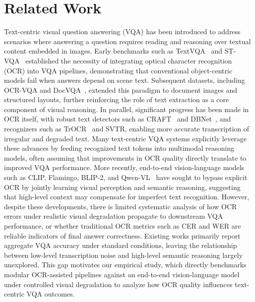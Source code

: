 \documentclass[conference]{IEEEtran}
\begin{document}

\section{Related Work}

Text-centric visual question answering (VQA) has been introduced to address scenarios where answering a question requires reading and reasoning over textual content embedded in images. Early benchmarks such as TextVQA~\cite{singh2019textvqa} and ST-VQA~\cite{biten2019stvqa} established the necessity of integrating optical character recognition (OCR) into VQA pipelines, demonstrating that conventional object-centric models fail when answers depend on scene text. Subsequent datasets, including OCR-VQA and DocVQA~\cite{mathew2021docvqa}, extended this paradigm to document images and structured layouts, further reinforcing the role of text extraction as a core component of visual reasoning. In parallel, significant progress has been made in OCR itself, with robust text detectors such as CRAFT~\cite{baek2019craft} and DBNet~\cite{liao2020dbnet}, and recognizers such as TrOCR~\cite{li2023trocr} and SVTR, enabling more accurate transcription of irregular and degraded text. Many text-centric VQA systems explicitly leverage these advances by feeding recognized text tokens into multimodal reasoning models, often assuming that improvements in OCR quality directly translate to improved VQA performance. More recently, end-to-end vision-language models such as CLIP, Flamingo, BLIP-2, and Qwen-VL~\cite{bai2023qwen} have sought to bypass explicit OCR by jointly learning visual perception and semantic reasoning, suggesting that high-level context may compensate for imperfect text recognition. However, despite these developments, there is limited systematic analysis of how OCR errors under realistic visual degradation propagate to downstream VQA performance, or whether traditional OCR metrics such as CER and WER are reliable indicators of final answer correctness. Existing works primarily report aggregate VQA accuracy under standard conditions, leaving the relationship between low-level transcription noise and high-level semantic reasoning largely unexplored. This gap motivates our empirical study, which directly benchmarks modular OCR-assisted pipelines against an end-to-end vision-language model under controlled visual degradation to analyze how OCR quality influences text-centric VQA outcomes.
\end{document}
